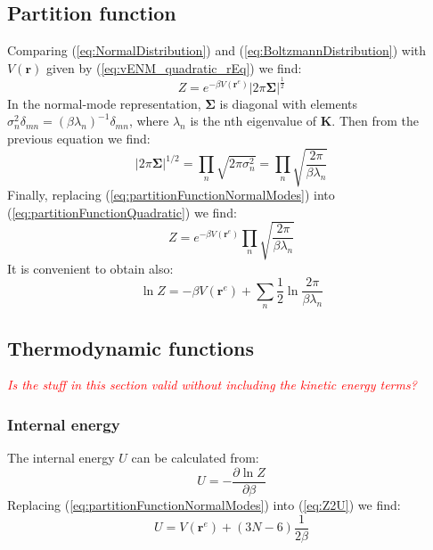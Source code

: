 \documentclass[12pt]{article}
\newcommand{\comment}[1]{\emph{\textcolor{red} {#1}}}
\newcommand{\rvector}{\mathbf{r}}
\newcommand{\rvectorEq}{\mathbf{r}^{e}}
\newcommand{\kmat}{\mathbf{K}}
\newcommand{\cmat}{\mathbf{\Sigma}}
\begin{document}
\subsection{Partition function}

Comparing (\ref{eq:NormalDistribution}) and (\ref{eq:BoltzmannDistribution}) with $V(\rvector)$ given by (\ref{eq:vENM_quadratic_rEq}) we find:
\begin{equation} \label{eq:partitionFunctionQuadratic}
Z = e^{-\beta V(\rvectorEq)} |2 \pi \cmat|^{\frac{1}{2}}
\end{equation}
In the normal-mode representation, $\cmat$ is diagonal with elements $\sigma_n^2 \delta_{mn} = (\beta \lambda_n)^{-1} \delta_{mn}$, where $\lambda_n$ is the nth eigenvalue of $\kmat$. Then from the previous equation we find:
\begin{equation} \label{eq:partitionFunctionNormalModes}
|2 \pi \cmat|^{1/2} = \prod_{n} \sqrt{2\pi \sigma_n^2} = \prod_{n} \sqrt{\frac{2\pi}{\beta \lambda_n}}
\end{equation}
Finally, replacing (\ref{eq:partitionFunctionNormalModes}) into  (\ref{eq:partitionFunctionQuadratic}) we find:
\begin{equation}
Z = e^{-\beta V(\rvectorEq)} \prod_{n} \sqrt{\frac{2 \pi}{\beta \lambda_n}}
\end{equation}
It is convenient to obtain also:
\begin{equation}
\ln Z = -\beta V(\rvectorEq) + \sum_{n} 
          \frac{1}{2} \ln \frac{2\pi}{\beta \lambda_n}
\end{equation}


\subsection{Thermodynamic functions}

\comment{Is the stuff in this section valid without including the kinetic energy terms?}

\subsubsection{Internal energy}

The internal energy $U$ can  be calculated from:
\begin{equation} \label{eq:Z2U}
U = - \frac{\partial \ln Z}{\partial \beta}
\end{equation}
Replacing (\ref{eq:partitionFunctionNormalModes}) into (\ref{eq:Z2U}) we find:
\begin{equation} \label{eq:spectrum2U}
U = V(\rvectorEq) + (3N - 6) \frac{1}{2\beta}
\end{equation}
\end{document}
